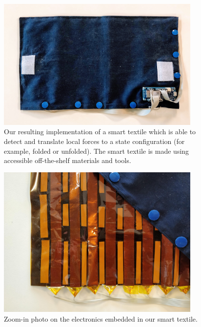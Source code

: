 \documentclass[\home/main.tex]{subfiles}
\begin{document}
\begin{figure}[htpb]
    \centering
    \includegraphics[width=0.90\textwidth, keepaspectratio]{figures/textile.jpg}
    \caption[Photo of smart textile implementation.]{Our resulting implementation of a smart textile which is able to detect and translate local forces to a state configuration (for example, folded or unfolded). The smart textile is made using accessible off-the-shelf materials and tools.}
    \label{fig:textile_real}
\end{figure}

\begin{figure}[htpb]
    \centering
    \includegraphics[width=0.90\textwidth, keepaspectratio]{figures/img-electronics-smart-textile.jpg}
    \caption{Zoom-in photo on the electronics embedded in our  smart textile.}
    \label{fig:textile_real_electronics}
\end{figure}
\end{document}
